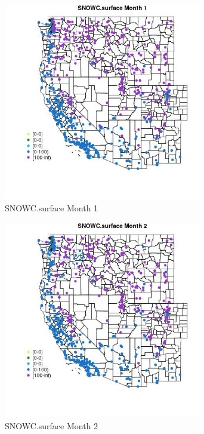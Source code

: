 \begin{figure} 
\centering  
\includegraphics[width=0.77\textwidth]{Code_Outputs/Report_ML_input_PM25_Step4_part_e_de_duplicated_aves_compiled_2019-05-14wNAs_MapObsMo1SNOWCsurface.jpg} 
\caption{\label{fig:Report_ML_input_PM25_Step4_part_e_de_duplicated_aves_compiled_2019-05-14wNAsMapObsMo1SNOWCsurface}SNOWC.surface Month 1} 
\end{figure} 
 

\begin{figure} 
\centering  
\includegraphics[width=0.77\textwidth]{Code_Outputs/Report_ML_input_PM25_Step4_part_e_de_duplicated_aves_compiled_2019-05-14wNAs_MapObsMo2SNOWCsurface.jpg} 
\caption{\label{fig:Report_ML_input_PM25_Step4_part_e_de_duplicated_aves_compiled_2019-05-14wNAsMapObsMo2SNOWCsurface}SNOWC.surface Month 2} 
\end{figure} 
 

